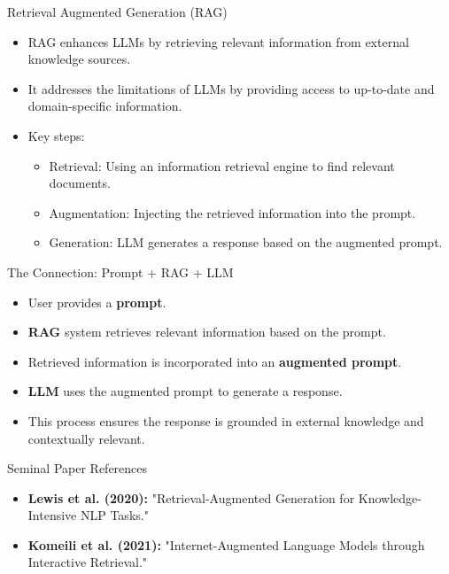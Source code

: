\documentclass{beamer}
\begin{document}
\begin{frame}{Retrieval Augmented Generation (RAG)}
  \begin{itemize}
    \item RAG enhances LLMs by retrieving relevant information from external knowledge sources.
    \item It addresses the limitations of LLMs by providing access to up-to-date and domain-specific information.
    \item Key steps:
      \begin{itemize}
        \item Retrieval: Using an information retrieval engine to find relevant documents.
        \item Augmentation: Injecting the retrieved information into the prompt.
        \item Generation: LLM generates a response based on the augmented prompt.
      \end{itemize}
  \end{itemize}
\end{frame}

\begin{frame}{The Connection: Prompt + RAG + LLM}
  \begin{itemize}
    \item User provides a \textbf{prompt}.
    \item \textbf{RAG} system retrieves relevant information based on the prompt.
    \item Retrieved information is incorporated into an \textbf{augmented prompt}.
    \item \textbf{LLM} uses the augmented prompt to generate a response.
    \item This process ensures the response is grounded in external knowledge and contextually relevant.
  \end{itemize}
\end{frame}

\begin{frame}{Seminal Paper References}
  \begin{itemize}
    \item \textbf{Lewis et al. (2020):} "Retrieval-Augmented Generation for Knowledge-Intensive NLP Tasks." \cite{lewis2020retrieval}
    \item \textbf{Komeili et al. (2021):} "Internet-Augmented Language Models through Interactive Retrieval." \cite{komeili2021internet}
  \end{itemize}
\end{frame}
\end{document}
